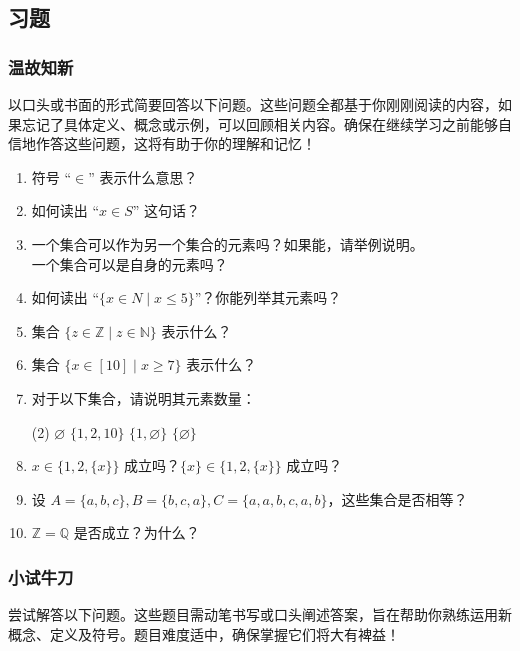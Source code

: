 \subsection{习题}

\subsubsection*{温故知新}

以口头或书面的形式简要回答以下问题。这些问题全都基于你刚刚阅读的内容，如果忘记了具体定义、概念或示例，可以回顾相关内容。确保在继续学习之前能够自信地作答这些问题，这将有助于你的理解和记忆！

\begin{enumerate}[label=(\arabic*)]
    \item 符号 ``$\in$'' 表示什么意思？
    \item 如何读出 ``$x \in S$'' 这句话？
    \item  一个集合可以作为另一个集合的元素吗？如果能，请举例说明。\\一个集合可以是自身的元素吗？
    \item 如何读出 ``$\{x \in N \mid x \le 5\}$''？你能列举其元素吗？
    \item 集合 $\{z \in \mathbb{Z} \mid z \in \mathbb{N}\}$ 表示什么？
    \item 集合 $\{x \in [10] \mid x \ge 7\}$ 表示什么？
    \item 对于以下集合，请说明其元素数量：
        \begin{tasks}(2)
            \task $\varnothing$
            \task $\{1, 2, 10\}$
            \task $\{1, \varnothing\}$
            \task $\{\varnothing\}$
        \end{tasks}
    \item $x \in \big\{ 1, 2, \{x\} \big\}$ 成立吗？$\{x\} \in \big\{ 1, 2, \{x\} \big\}$ 成立吗？
    \item 设 $A = \{a, b, c\}, B = \{b, c, a\}, C = \{a, a, b, c, a, b\}$，这些集合是否相等？
    \item $\mathbb{Z} = \mathbb{Q}$ 是否成立？为什么？
\end{enumerate}

\subsubsection*{小试牛刀}

尝试解答以下问题。这些题目需动笔书写或口头阐述答案，旨在帮助你熟练运用新概念、定义及符号。题目难度适中，确保掌握它们将大有裨益！

